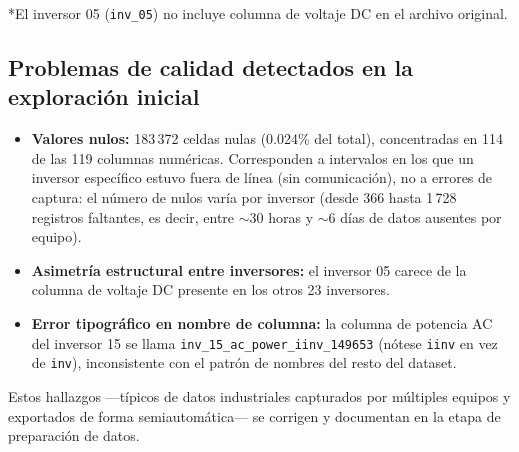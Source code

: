 *El inversor 05 (\texttt{inv\_05}) no incluye columna de voltaje DC en el archivo original.

\subsection*{Problemas de calidad detectados en la exploración inicial}

\begin{itemize}
    \item \textbf{Valores nulos:} 183\,372 celdas nulas (0.024\% del total), concentradas en 114 de las 119 columnas numéricas. Corresponden a intervalos en los que un inversor específico estuvo fuera de línea (sin comunicación), no a errores de captura: el número de nulos varía por inversor (desde 366 hasta 1\,728 registros faltantes, es decir, entre $\sim$30 horas y $\sim$6 días de datos ausentes por equipo).
    \item \textbf{Asimetría estructural entre inversores:} el inversor 05 carece de la columna de voltaje DC presente en los otros 23 inversores.
    \item \textbf{Error tipográfico en nombre de columna:} la columna de potencia AC del inversor 15 se llama \texttt{inv\_15\_ac\_power\_iinv\_149653} (nótese \texttt{iinv} en vez de \texttt{inv}), inconsistente con el patrón de nombres del resto del dataset.
\end{itemize}

Estos hallazgos —típicos de datos industriales capturados por múltiples equipos y exportados de forma semiautomática— se corrigen y documentan en la etapa de preparación de datos.
